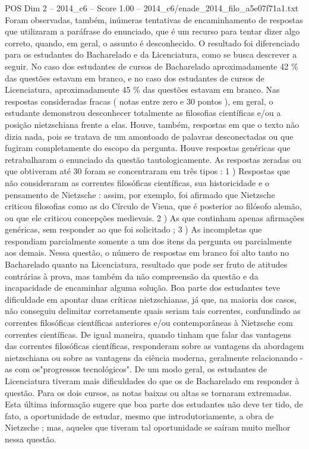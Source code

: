 \begin{textsample}{POS Dim 2 – 2014\_c6 – Score 1.00 – 2014\_c6/enade\_2014\_filo\_a5e07f71a1.txt}
Foram observadas, também, inúmeras tentativas de encaminhamento de respostas que utilizaram a paráfrase do enunciado, que é um recurso para tentar dizer algo correto, quando, em geral, o assunto é desconhecido.
O resultado foi diferenciado para os estudantes do Bacharelado e da Licenciatura, como se busca descrever a seguir.
No caso dos estudantes de cursos de Bacharelado aproximadamente 42 \% das questões estavam em branco, e no caso dos estudantes de cursos de Licenciatura, aproximadamente 45 \% das questões estavam em branco.
Nas respostas consideradas fracas ( notas entre zero e 30 pontos ), em geral, o estudante demonstrou desconhecer totalmente as filosofias científicas e/ou a posição nietzschiana frente a elas.
Houve, também, respostas em que o texto não dizia nada, pois se tratava de um amontoado de palavras desconectadas ou que fugiram completamente do escopo da pergunta.
Houve respostas genéricas que retrabalharam o enunciado da questão tautologicamente.
As respostas zeradas ou que obtiveram até 30 foram se concentraram em três tipos : 1 ) Respostas que não consideraram as correntes filosóficas científicas, sua historicidade e o pensamento de Nietzsche : assim, por exemplo, foi afirmado que Nietzsche criticou filosofias como as do Círculo de Viena, que é posterior ao filósofo alemão, ou que ele criticou concepções medievais. 2 ) As que continham apenas afirmações genéricas, sem responder ao que foi solicitado ; 3 ) As incompletas que respondiam parcialmente somente a um dos itens da pergunta ou parcialmente aos demais.
Nessa questão, o número de respostas em branco foi alto tanto no Bacharelado quanto na Licenciatura, resultado que pode ser fruto de atitudes contrárias à prova, mas também da não compreensão da questão e da incapacidade de encaminhar alguma solução.
Boa parte dos estudantes teve dificuldade em apontar duas críticas nietzschianas, já que, na maioria dos casos, não conseguiu delimitar corretamente quais seriam tais correntes, confundindo as correntes filosóficas científicas anteriores e/ou contemporâneas à Nietzsche com correntes científicas.
De igual maneira, quando tinham que falar das vantagens das correntes filosóficas científicas, responderam sobre as vantagens da abordagem nietzschiana ou sobre as vantagens da ciência moderna, geralmente relacionando -as com os"progressos tecnológicos".
De um modo geral, os estudantes de Licenciatura tiveram mais dificuldades do que os de Bacharelado em responder à questão.
Para os dois cursos, as notas baixas ou altas se tornaram extremadas.
Esta última informação sugere que boa parte dos estudantes não deve ter tido, de fato, a oportunidade de estudar, mesmo que introdutoriamente, a obra de Nietzsche ; mas, aqueles que tiveram tal oportunidade se saíram muito melhor nessa questão.

\end{textsample}
